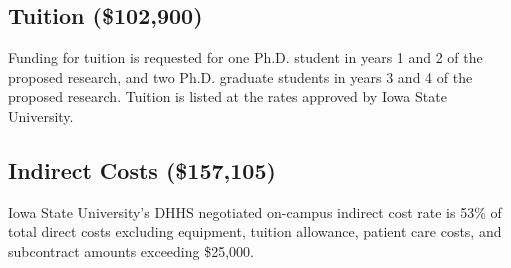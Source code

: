 \documentclass[12pt,letterpaper]{article}
\begin{document}
	
	\subsection*{Tuition (\$102,900)}
	Funding for tuition is requested for one Ph.D. student in years 1 and 2 of the proposed research, and two Ph.D. graduate students in years 3 and 4 of the proposed research.  Tuition is listed at the rates approved by Iowa State University.
	
	\subsection*{Indirect Costs (\$157,105)}
	Iowa State University's DHHS negotiated on-campus indirect cost rate is 53\% of total direct costs excluding equipment, tuition allowance, patient care costs, and subcontract amounts exceeding \$25,000.
	
	
\end{document}
